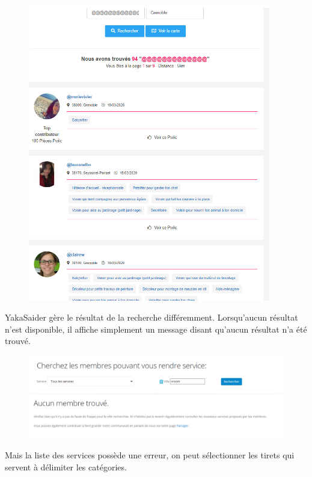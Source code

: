 \documentclass[a4paper,11pt]{article}
\begin{document}
\begin{figure}[H]
  \includegraphics[width=400px]{images/gestion-erreur-yakasaider.png}
  \label{fig:gestion-erreur-yakasaider}
\end{figure}

YakaSaider gère le résultat de la recherche différemment. Lorsqu’aucun résultat n’est disponible,
il affiche simplement un message disant qu’aucun résultat n’a été trouvé.\\

\begin{figure}[H]
  \includegraphics[width=\linewidth]{images/pas-trouve-yakasaider.png}
  \label{fig:pas-trouve-yakasaider}
\end{figure}

Mais la liste des services possède une erreur, on peut sélectionner les tirets qui servent à délimiter les catégories.\\
\end{document}
